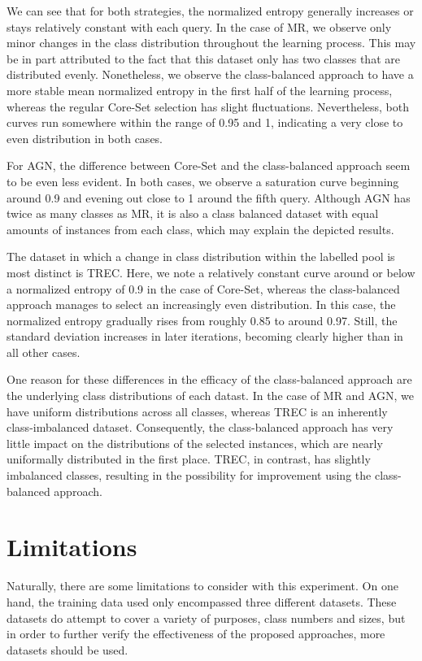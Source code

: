 \documentclass[english,bachelor,ul]{webisthesis} %
\begin{document}
We can see that for both strategies, the normalized entropy generally increases or stays relatively constant with each query. In the case of MR, we observe only minor changes in the class distribution throughout the learning process. This may be in part attributed to the fact that this dataset only has two classes that are distributed evenly. Nonetheless, we observe the class-balanced approach to have a more stable mean normalized entropy in the first half of the learning process, whereas the regular Core-Set selection has slight fluctuations. Nevertheless, both curves run somewhere within the range of 0.95 and 1, indicating a very close to even distribution in both cases. 

For AGN, the difference between Core-Set and the class-balanced approach seem to be even less evident. In both cases, we observe a saturation curve beginning around 0.9 and evening out close to 1 around the fifth query. Although AGN has twice as many classes as MR, it is also a class balanced dataset with equal amounts of instances from each class, which may explain the depicted results.

The dataset in which a change in class distribution within the labelled pool is most distinct is TREC. Here, we note a relatively constant curve around or below a normalized entropy of 0.9 in the case of Core-Set, whereas the class-balanced approach manages to select an increasingly even distribution. In this case, the normalized entropy gradually rises from roughly 0.85 to around 0.97. Still, the standard deviation increases in later iterations, becoming clearly higher than in all other cases. 

One reason for these differences in the efficacy of the class-balanced approach are the underlying class distributions of each datast. In the case of MR and AGN, we have uniform distributions across all classes, whereas TREC is an inherently class-imbalanced dataset. Consequently, the class-balanced approach has very little impact on the distributions of the selected instances, which are nearly uniformally distributed in the first place. TREC, in contrast, has slightly imbalanced classes, resulting in the possibility for improvement using the class-balanced approach.

\section{Limitations}

Naturally, there are some limitations to consider with this experiment. On one hand, the training data used only encompassed three different datasets. These datasets do attempt to cover a variety of purposes, class numbers and sizes, but in order to further verify the effectiveness of the proposed approaches, more datasets should be used. 
\end{document}
